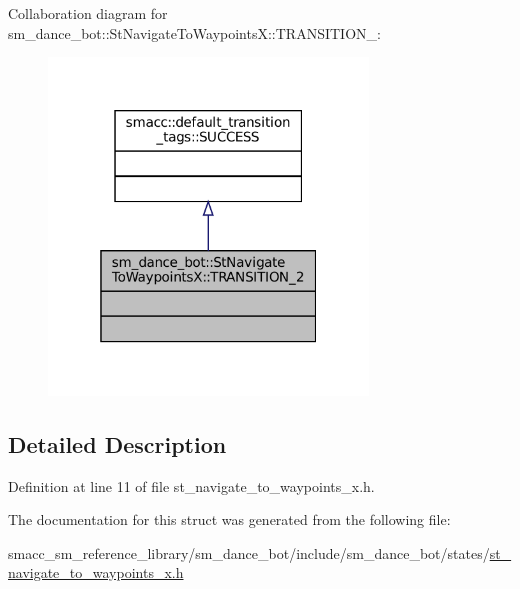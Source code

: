 Collaboration diagram for sm\+\_\+dance\+\_\+bot\+:\+:St\+Navigate\+To\+WaypointsX\+:\+:T\+R\+A\+N\+S\+I\+T\+I\+O\+N\+\_\+:
\nopagebreak
\begin{figure}[H]
\begin{center}
\leavevmode
\includegraphics[width=241pt]{structsm__dance__bot_1_1StNavigateToWaypointsX_1_1TRANSITION__2__coll__graph}
\end{center}
\end{figure}


\subsection{Detailed Description}


Definition at line 11 of file st\+\_\+navigate\+\_\+to\+\_\+waypoints\+\_\+x.\+h.



The documentation for this struct was generated from the following file\+:\begin{DoxyCompactItemize}
\item 
smacc\+\_\+sm\+\_\+reference\+\_\+library/sm\+\_\+dance\+\_\+bot/include/sm\+\_\+dance\+\_\+bot/states/\hyperlink{sm__dance__bot_2include_2sm__dance__bot_2states_2st__navigate__to__waypoints__x_8h}{st\+\_\+navigate\+\_\+to\+\_\+waypoints\+\_\+x.\+h}\end{DoxyCompactItemize}
